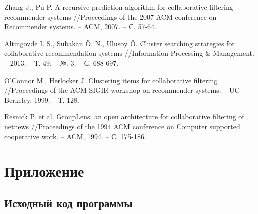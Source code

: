 \documentclass[a4paper, 12pt]{article} %
\begin{document}
\begin{thebibliography}{99}
 Zhang J., Pu P. A recursive prediction algorithm for collaborative filtering recommender systems //Proceedings of the 2007 ACM conference on Recommender systems. – ACM, 2007. – С. 57-64.

 Altingovde I. S., Subakan Ö. N., Ulusoy Ö. Cluster searching strategies for collaborative recommendation systems //Information Processing \& Management. – 2013. – Т. 49. – №. 3. – С. 688-697.

 O’Connor M., Herlocker J. Clustering items for collaborative filtering //Proceedings of the ACM SIGIR workshop on recommender systems. – UC Berkeley, 1999. – Т. 128.

 Resnick P. et al. GroupLens: an open architecture for collaborative filtering of netnews //Proceedings of the 1994 ACM conference on Computer supported cooperative work. – ACM, 1994. – С. 175-186.

\end{thebibliography}

\newpage
\section{Приложение}
\subsection{Исходный код программы}
\end{document}
